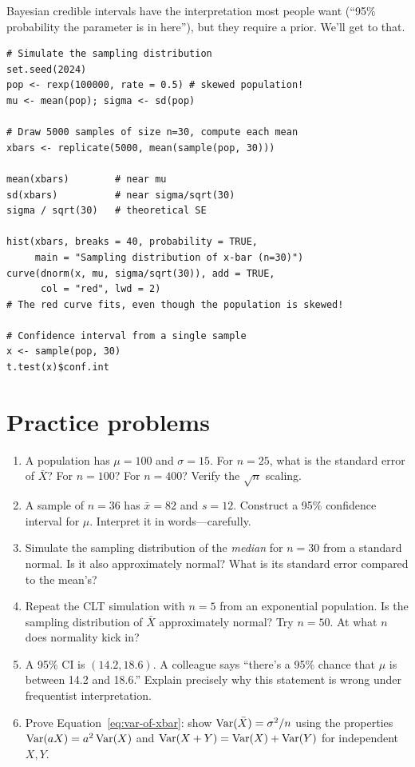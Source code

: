  Bayesian credible intervals have the interpretation most people want (``95\% probability the parameter is in here''), but they require a prior. We'll get to that.

\begin{codelab}
\begin{lstlisting}[language=Rlang]
# Simulate the sampling distribution
set.seed(2024)
pop <- rexp(100000, rate = 0.5) # skewed population!
mu <- mean(pop); sigma <- sd(pop)

# Draw 5000 samples of size n=30, compute each mean
xbars <- replicate(5000, mean(sample(pop, 30)))

mean(xbars)        # near mu
sd(xbars)          # near sigma/sqrt(30)
sigma / sqrt(30)   # theoretical SE

hist(xbars, breaks = 40, probability = TRUE,
     main = "Sampling distribution of x-bar (n=30)")
curve(dnorm(x, mu, sigma/sqrt(30)), add = TRUE,
      col = "red", lwd = 2)
# The red curve fits, even though the population is skewed!

# Confidence interval from a single sample
x <- sample(pop, 30)
t.test(x)$conf.int
\end{lstlisting}
\end{codelab}

\section{Practice problems}

\begin{enumerate}
  \item A population has $\mu = 100$ and $\sigma = 15$. For $n = 25$, what is the standard error of $\bar{X}$? For $n = 100$? For $n = 400$? Verify the $\sqrt{n}$ scaling.

  \item A sample of $n = 36$ has $\bar{x} = 82$ and $s = 12$. Construct a 95\% confidence interval for $\mu$. Interpret it in words---carefully.

  \item Simulate the sampling distribution of the \emph{median} for $n = 30$ from a standard normal. Is it also approximately normal? What is its standard error compared to the mean's?

  \item Repeat the CLT simulation with $n = 5$ from an exponential population. Is the sampling distribution of $\bar{X}$ approximately normal? Try $n = 50$. At what $n$ does normality kick in?

  \item A 95\% CI is $(14.2, 18.6)$. A colleague says ``there's a 95\% chance that $\mu$ is between 14.2 and 18.6.'' Explain precisely why this statement is wrong under frequentist interpretation.

  \item Prove Equation~\ref{eq:var-of-xbar}: show $\operatorname{Var}(\bar{X}) = \sigma^2/n$ using the properties $\operatorname{Var}(aX) = a^2\operatorname{Var}(X)$ and $\operatorname{Var}(X + Y) = \operatorname{Var}(X) + \operatorname{Var}(Y)$ for independent $X, Y$.
\end{enumerate}


